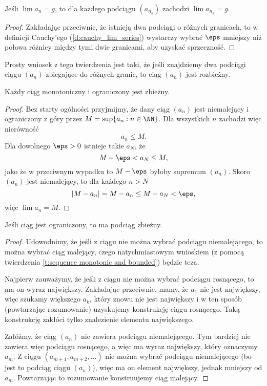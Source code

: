 \documentclass[11pt]{scrartcl}
\begin{document}
    \begin{theorem}
        \label{t:lim_subsequence=lim_sequence}
        Jeśli $\lim a_n = g$, to dla każdego podciągu $(a_{n_k})$ zachodzi $\lim a_{n_k} = g$.
    \end{theorem}
    \begin{proof}
        Zakładając przeciwnie, że istnieją dwa podciągi o różnych granicach, to w definicji Cauchy'ego (\ref{d:cauchy_lim_series}) wystarczy wybrać $\eps$ mniejszy niż połowa różnicy między tymi dwie granicami, aby uzyskać sprzeczność.
    \end{proof}

    Prosty wniosek z tego twierdzenia jest taki, że jeśli znajdziemy dwa podciągi ciągu $(a_n)$ zbiegające do różnych granic, to ciąg $(a_n)$ jest rozbieżny.

    \begin{theorem}
        \label{t:sequence monotonic and bounded}
        Każdy ciąg monotoniczny i ograniczony jest zbieżny.
    \end{theorem}
    \begin{proof}
        Bez starty ogólności przyjmijmy, że dany ciąg $(a_n)$ jest niemalejący i ograniczony z góry przez $M = \sup\{a_n : n \in \NN\}$. Dla wszystkich $n$ zachodzi więc nierówność
        \[ a_n \leq M. \]
        Dla dowolnego $\eps > 0$ istnieje takie $a_N$, że
        \[ M - \eps < a_N \leq M, \]
        jako że w przeciwnym wypadku to $M - \eps$ byłoby supremum $(a_n)$. Skoro $(a_n)$ jest niemalejący, to dla każdego $n > N$
        \[ |M - a_n| = M - a_n \leq M - a_N < \eps, \]
        więc $\lim a_n = M$.
    \end{proof}

    \begin{theorem}
        Jeśli ciąg jest ograniczony, to ma podciąg zbieżny.
    \end{theorem}
    \begin{proof}
        Udowodnimy, że jeśli z ciągu nie można wybrać podciągu niemalejącego, to można wybrać ciąg malejący, czego natychmiastowym wnioskiem (z pomocą twierdzenia \ref{t:sequence monotonic and bounded}) będzie teza.

        Najpierw zauważymy, że jeśli z ciągu nie można wybrać podciągu rosnącego, to ma on wyraz największy. Zakładając przeciwnie, mamy, że $a_1$ nie jest największy, więc szukamy większego $a_k$, który znowu nie jest największy i w ten sposób (powtarzając rozumowanie) uzyskujemy konstrukcję ciągu rosnącego. Taką konstrukcję zakłóci tylko znalezienie elementu największego.

        Załóżmy, że ciąg $(a_n)$ nie zawiera podciągu niemalejącego. Tym bardziej nie zawiera więc podciągu rosnącego, a więc ma wyraz największy, który oznaczymy $a_m$. Z ciągu $(a_{m+1}, a_{m+2}, \ldots)$ nie można wybrać podciągu niemalejącego (bo jest to podciąg ciągu $(a_n)$), więc ma on element największy, jednak mniejszy od $a_m$. Powtarzając to rozumowanie konstruujemy ciąg malejący.
    \end{proof}
\end{document}
